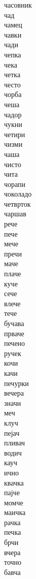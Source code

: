 \documentclass[a5paper,12pt]{article}
\newenvironment{activity}[1]{%
  \begin{tcolorbox}[colback=boxcolor,colframe=titlecolor,title={\textbf{#1}},fonttitle=\bfseries]
}{%
  \end{tcolorbox}
}
\begin{document}
\begin{activity}{Зборчиња}
\begin{multicols}{4}
часовник\\ чад\\ чамец\\ чавки\\ чади\\ чепка\\ чека\\ четка\\ често\\ чорба\\ чеша\\ чадор\\ чукни\\ четири\\ чизми\\ чаша\\ чисто\\ чита\\ чорапи\\ чоколадо\\ четврток\\
чаршав\\ рече\\ пече\\ мече\\ пречи\\ маче\\ плаче\\ куче\\ сече\\ влече\\ тече\\ бучава\\ прваче\\ печено\\ ручек\\ кочи\\ качи\\ печурки\\ вечера\\ значи\\ меч\\ клуч\\
пејач\\ пливач\\ водич\\ кауч\\ ично\\ квачка\\ пајче\\ момче\\ маичка\\ рачка\\ печка\\ брчи\\ вчера\\ точно\\ бавча
\end{multicols}
\end{activity}
\end{document}
